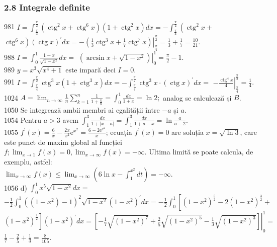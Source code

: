 \documentclass[11pt]{article}
\begin{document}
\subsubsection*{2.8 Integrale definite}
981 $I=\int_{\frac{\pi}{4}}^{\frac{\pi}{2}}\left(\operatorname{ctg}^{2} x+\operatorname{ctg}^{6} x\right)\left(1+\operatorname{ctg}^{2} x\right) d x=-\int_{\frac{\pi}{4}}^{\frac{\pi}{2}}\left(\operatorname{ctg}^{2} x+\right.$ $\left.\operatorname{ctg}^{6} x\right)(\operatorname{ctg} x)^{\prime} d x=-\left.\left(\frac{1}{3} \operatorname{ctg}^{3} x+\frac{1}{7} \operatorname{ctg}^{7} x\right)\right|_{\frac{\pi}{4}} ^{\frac{\pi}{2}}=\frac{1}{3}+\frac{1}{7}=\frac{10}{21}$.\\
988 $I=\int_{0}^{1} \frac{1-x}{\sqrt{1-x^{2}}} d x=$ $\left.\left(\arcsin x+\sqrt{1-x^{2}}\right)\right|_{0} ^{1}=\frac{\pi}{2}-1$.\\
989 $y=x^{3} \sqrt{x^{4}+1}$ este impară deci $I=0$.\\
991 $I=\int_{\frac{\pi}{4}}^{\frac{\pi}{2}} \operatorname{ctg}^{3} x\left(1+\operatorname{ctg}^{3} x\right) d x=-\int_{\frac{\pi}{4}}^{\frac{\pi}{2}} \operatorname{ctg}^{3} x \cdot(\operatorname{ctg} x)^{\prime} d x=$ $-\left.\frac{\operatorname{ctg}^{4} x}{4}\right|_{\frac{\pi}{4}} ^{\frac{\pi}{2}}=\frac{1}{4}$.\\
1024 $A=\lim _{n \rightarrow \infty} \frac{1}{n} \sum_{k=1}^{n} \frac{1}{1+\frac{k}{n}}=\int_{0}^{1} \frac{d x}{1+x}=\ln 2 ;$ analog se calculează și $B$.\\
1050 Se integrează ambii membri ai egalității între $-a$ și $a$.\\
1054 Pentru $a>3$ avem $\int_{1}^{3} \frac{d x}{1+|x-a|}=\int_{1}^{3} \frac{d x}{1+a-x}=\ln \frac{a}{a-2}$.\\
1055 $f^{\prime}(x)=\frac{6}{x}-\frac{2 x}{x^{2}} \mathrm{e}^{x^{2}}=\frac{6-2 \mathrm{e}^{x^{2}}}{x}$; ecuația $f^{\prime}(x)=0$ are soluția $x=\sqrt{\ln 3}$, care este punct de maxim global al funcției $f ; \lim _{x \rightarrow 1} f(x)=0, \lim _{x \rightarrow \infty} f(x)=-\infty$. Ultima limită se poate calcula, de exemplu, astfel:\\
$\left.\lim _{x \rightarrow \infty} f(x) \leq \lim _{x \rightarrow \infty}\left(6 \ln x-\int_{1}^{x^{2}} d t\right)=-\infty\right.$.\\
1056 d) $\int_{0}^{1} x^{5} \sqrt{1-x^{2}} d x=$\\$-\frac{1}{2} \int_{0}^{1}\left(\left(1-x^{2}\right)-1\right)^{2} \sqrt{1-x^{2}}\left(1-x^{2}\right)^{\prime} d x=-\frac{1}{2} \int_{0}^{1}\left[\left(1-x^{2}\right)^{\frac{5}{2}}-2\left(1-x^{2}\right)^{\frac{3}{2}}+\right.$ $\left.\left(1-x^{2}\right)^{\frac{1}{2}}\right]\left(1-x^{2}\right)^{\prime} d x=\left.\left[-\frac{1}{7} \sqrt{\left(1-x^{2}\right)^{7}}+\frac{2}{5} \sqrt{\left(1-x^{2}\right)^{5}}-\frac{1}{3} \sqrt{\left(1-x^{2}\right)^{3}}\right]\right|_{0} ^{1}=$ $\frac{1}{7}-\frac{2}{5}+\frac{1}{3}=\frac{8}{105}$.\\
\end{document}
